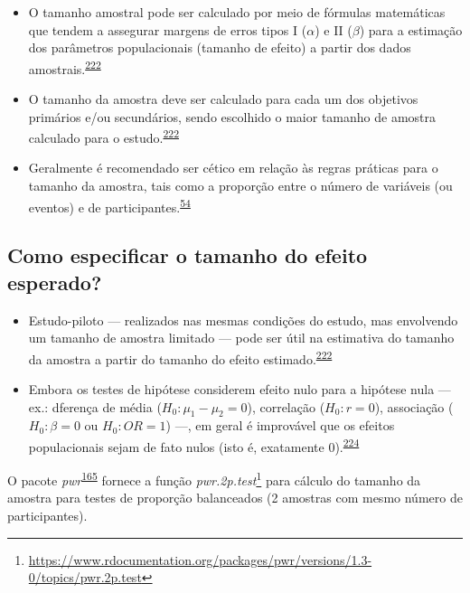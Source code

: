 \documentclass[
  a4paper,
]{book}
\renewcommand{\href}[2]{#2\footnote{\url{#1}}}
\newenvironment{infobox}[1]
  {
  \begin{itemize}
  \renewcommand{\labelitemi}{
    \raisebox{-.7\height}[0pt][0pt]{
      {\setkeys{Gin}{width=3em,keepaspectratio}
        \texttt{[image: \#1]}}
    }
  }
  \setlength{\fboxsep}{1em}
  \begin{blackbox}
  \item
  }
  {
  \end{blackbox}
  \end{itemize}
  }
\begin{document}
\begin{itemize}
\item
  O tamanho amostral pode ser calculado por meio de fórmulas matemáticas que tendem a assegurar margens de erros tipos I (\(\alpha\)) e II (\(\beta\)) para a estimação dos parâmetros populacionais (tamanho de efeito) a partir dos dados amostrais.\textsuperscript{\protect\hyperlink{ref-rodruxedguezdeluxe1guila2014}{222}}
\item
  O tamanho da amostra deve ser calculado para cada um dos objetivos primários e/ou secundários, sendo escolhido o maior tamanho de amostra calculado para o estudo.\textsuperscript{\protect\hyperlink{ref-rodruxedguezdeluxe1guila2014}{222}}
\item
  Geralmente é recomendado ser cético em relação às regras práticas para o tamanho da amostra, tais como a proporção entre o número de variáveis (ou eventos) e de participantes.\textsuperscript{\protect\hyperlink{ref-van2022a}{54}}
\end{itemize}

\hypertarget{como-especificar-o-tamanho-do-efeito-esperado}{%
\subsection{Como especificar o tamanho do efeito esperado?}\label{como-especificar-o-tamanho-do-efeito-esperado}}

\begin{itemize}
\item
  Estudo-piloto --- realizados nas mesmas condições do estudo, mas envolvendo um tamanho de amostra limitado --- pode ser útil na estimativa do tamanho da amostra a partir do tamanho do efeito estimado.\textsuperscript{\protect\hyperlink{ref-rodruxedguezdeluxe1guila2014}{222}}
\item
  Embora os testes de hipótese considerem efeito nulo para a hipótese nula --- ex.: dferença de média (\(H_{0}: \mu_{1} - \mu_{2}=0\)), correlação (\(H_{0}: r=0\)), associação (\(H_{0}: \beta=0\) ou \(H_{0}: OR=1\)) ---, em geral é improvável que os efeitos populacionais sejam de fato nulos (isto é, exatamente 0).\textsuperscript{\protect\hyperlink{ref-Andrade2020}{224}}
\end{itemize}

\begin{infobox}{images/Rlogo}
O pacote \emph{pwr}\textsuperscript{\protect\hyperlink{ref-pwr}{165}} fornece a função \href{https://www.rdocumentation.org/packages/pwr/versions/1.3-0/topics/pwr.2p.test}{\emph{pwr.2p.test}} para cálculo do tamanho da amostra para testes de proporção balanceados (2 amostras com mesmo número de participantes).

\end{infobox}
\end{document}
